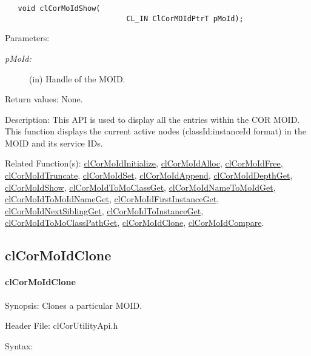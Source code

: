 \begin{flushleft}
\begin{Desc}
\footnotesize\begin{verbatim}   void clCorMoIdShow(
              				CL_IN ClCorMOIdPtrT pMoId);
\end{verbatim}
\normalsize
\end{Desc}
\begin{Desc}
\item[Parameters:]
\begin{description}
\item[{\em p\-MoId:}](in) Handle of the MOID.\end{description}
\end{Desc}
\begin{Desc}
\item[Return values:] None.\end{Desc}
\begin{Desc}
\item[Description:]This API is used to display all the entries within the COR MOID. This function displays the current active nodes 
(classId:instanceId format) in the MOID and its service IDs.\end{Desc}
\begin{Desc}
\item[Related Function(s):]\hyperlink{pagecor100}{cl\-Cor\-MoId\-Initialize}, \hyperlink{pagecor113}{cl\-Cor\-MoId\-Alloc}, 
\hyperlink{pagecor114}{cl\-Cor\-MoId\-Free},
\hyperlink{pagecor115}{cl\-Cor\-MoId\-Truncate}, 
\hyperlink{pagecor116}{cl\-Cor\-MoId\-Set}, 
\hyperlink{pagecor117}{cl\-Cor\-MoId\-Append}, 
\hyperlink{pagecor118}{cl\-Cor\-MoId\-Depth\-Get}, 
\hyperlink{pagecor119}{cl\-Cor\-MoId\-Show}, 
\hyperlink{pagecor120}{cl\-Cor\-MoId\-To\-Mo\-Class\-Get}, 
\hyperlink{pagecor121}{cl\-Cor\-MoId\-Name\-To\-MoId\-Get}, 
\hyperlink{pagecor122}{cl\-Cor\-MoId\-To\-MoId\-Name\-Get}, 
\hyperlink{pagecor123}{cl\-Cor\-MoId\-First\-Instance\-Get},
\hyperlink{pagecor124}{cl\-Cor\-MoId\-Next\-Sibling\-Get}, 
\hyperlink{pagecor125}{cl\-Cor\-MoId\-To\-Instance\-Get}, 
\hyperlink{pagecor126}{cl\-Cor\-MoId\-To\-Mo\-Class\-Path\-Get}, 
\hyperlink{pagecor127}{cl\-Cor\-MoId\-Clone}, 
\hyperlink{pagecor128}{cl\-Cor\-MoId\-Compare}.\end{Desc}
\newpage


\subsection{clCorMoIdClone}
\hypertarget{pagecor127}{}\paragraph{cl\-Cor\-MoId\-Clone}\label{pagecor127}
\begin{Desc}
\item[Synopsis:]Clones a particular MOID.\end{Desc}
\begin{Desc}
\item[Header File:]clCorUtilityApi.h\end{Desc}
\begin{Desc}
\item[Syntax:]


\end{Desc}
\end{flushleft}
